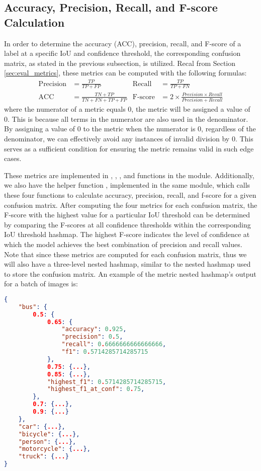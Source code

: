 \subsection{Accuracy, Precision, Recall, and F-score Calculation}
In order to determine the accuracy (ACC), precision, recall, and F-score of a label at a specific IoU and confidence threshold, the corresponding confusion matrix, as stated in the previous subsection, is utilized.
Recal from Section \ref{sec:eval_metrics}, these metrics can be computed with the following formulas: 
\begin{align*}
    \text{Precision} &= \frac{TP}{TP+FP}     &  \text{Recall} &= \frac{TP}{TP+FN} \\
    \text{ACC} &= \frac{TN+TP}{TN+FN+TP+FP}  &  \text{F-score} &= 2 \times \frac{Precision \times Recall}{Precision + Recall}
\end{align*}
where the numerator of a metric equals 0, the metric will be assigned a value of 0. This is because all terms in the numerator are also used in the denominator. By assigning a value of 0 to the metric when the numerator is 0, regardless of the denominator, we can effectively avoid any instances of invalid division by 0. This serves as a sufficient condition for ensuring the metric remains valid in such edge cases.

These metrics are implemented in , , , and  functions in the  module. Additionally, we also have the helper function , implemented in the same module, which calls these four functions to calculate accuracy, precision, recall, and f-score for a given confusion matrix. After computing the four metrics for each confusion matrix, the F-score with the highest value for a particular IoU threshold can be determined by comparing the F-scores at all confidence thresholds within the corresponding IoU threshold hashmap. The highest F-score indicates the level of confidence at which the model achieves the best combination of precision and recall values. Note that since these metrics are computed for each confusion matrix, thus we will also have a three-level nested hashmap, similar to the nested hashmap used to store the confusion matrix. An example of the metric nested hashmap's output for a batch of images is:
\begin{lstlisting}[language=json,firstnumber=1]
{
    "bus": {
        0.5: {
            0.65: {
                "accuracy": 0.925,
                "precision": 0.5,
                "recall": 0.6666666666666666,
                "f1": 0.5714285714285715
            },
            0.75: {...},
            0.85: {...},
            "highest_f1": 0.5714285714285715,
            "highest_f1_at_conf": 0.75,
        },
        0.7: {...},
        0.9: {...}
    },
    "car": {...},
    "bicycle": {...},
    "person": {...},
    "motorcycle": {...},
    "truck": {...}
}
\end{lstlisting}

